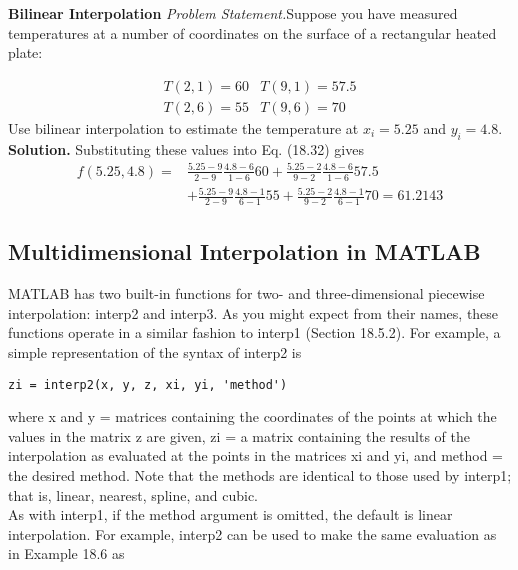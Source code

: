 \documentclass[../main.tex]{subfiles}
\begin{document}
\begin{exmp} \textbf{Bilinear Interpolation}
    \noindent\textit{Problem Statement.}Suppose you have measured temperatures at a number of coordinates on the surface of a rectangular heated plate:

    \begin{equation}
    \begin{array}{ll}
    T(2,1)=60 & T(9,1)=57.5 \\
    T(2,6)=55 & T(9,6)=70
    \end{array}\nonumber
\end{equation}
    Use bilinear interpolation to estimate the temperature at $x_{i}=5.25$ and $y_{i}=4.8$.
    \noindent \textbf{Solution.} Substituting these values into Eq. (18.32) gives
    \begin{equation}
    \begin{aligned}
    f(5.25,4.8)=& \frac{5.25-9}{2-9} \frac{4.8-6}{1-6} 60+\frac{5.25-2}{9-2} \frac{4.8-6}{1-6} 57.5 \\
    &+\frac{5.25-9}{2-9} \frac{4.8-1}{6-1} 55+\frac{5.25-2}{9-2} \frac{4.8-1}{6-1} 70=61.2143
    \end{aligned}\nonumber
\end{equation}

\end{exmp}

\subsection{ Multidimensional Interpolation in MATLAB}
MATLAB has two built-in functions for two- and three-dimensional piecewise interpolation: interp2 and interp3. As you might expect from their names, these functions operate in a similar fashion to interp1 (Section 18.5.2). For example, a simple representation
of the syntax of interp2 is 
\begin{lstlisting}[numbers=none]
zi = interp2(x, y, z, xi, yi, 'method')
\end{lstlisting}
where x and y = matrices containing the coordinates of the points at which the values in
the matrix z are given, zi = a matrix containing the results of the interpolation as evaluated at the points in the matrices xi and yi, and method = the desired method. Note that
the methods are identical to those used by interp1; that is, linear, nearest, spline,
and cubic.\\
As with interp1, if the method argument is omitted, the default is linear interpolation.
For example, interp2 can be used to make the same evaluation as in Example 18.6 as
\end{document}
